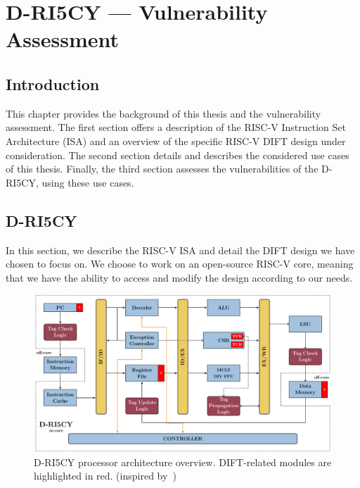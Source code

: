 \chapter{D-RI5CY — Vulnerability Assessment}
\label{chapter:dift_assessment}
\minitoc

\section{Introduction}
This chapter provides the background of this thesis and the vulnerability assessment. The first section offers a description of the RISC-V Instruction Set Architecture (ISA) and an overview of the specific RISC-V DIFT design under consideration.
The second section details and describes the considered use cases of this thesis.
Finally, the third section assesses the vulnerabilities of the D-RI5CY, using these use cases.

\section{D-RI5CY}
\label{section:driscy}
In this section, we describe the RISC-V ISA and detail the DIFT design we have chosen to focus on.
We choose to work on an open-source RISC-V core, meaning that we have the ability to access and modify the design according to our needs.

\begin{figure}[t]
    \centering
    \includegraphics[width=\textwidth]{c3_vulnerabilities_assessment/img/RI5CY.pdf}
    \caption{D-RI5CY processor architecture overview. DIFT-related modules are highlighted in red. (inspired by~\cite{PDGLC-18-hpec})}
    \label{fig:driscy}
\end{figure}

